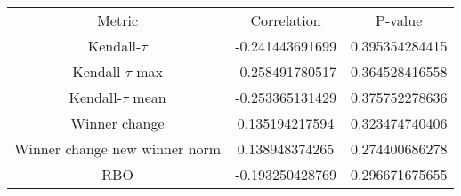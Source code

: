 \begin{tabular}{c|c|c}
Metric & Correlation & P-value \\ 
Kendall-$\tau$ & -0.241443691699 & 0.395354284415 \\ 
Kendall-$\tau$ max & -0.258491780517 & 0.364528416558 \\ 
Kendall-$\tau$ mean & -0.253365131429 & 0.375752278636 \\ 
Winner change & 0.135194217594 & 0.323474740406 \\ 
Winner change new winner norm & 0.138948374265 & 0.274400686278 \\ 
RBO & -0.193250428769 & 0.296671675655 \\ 
\end{tabular}